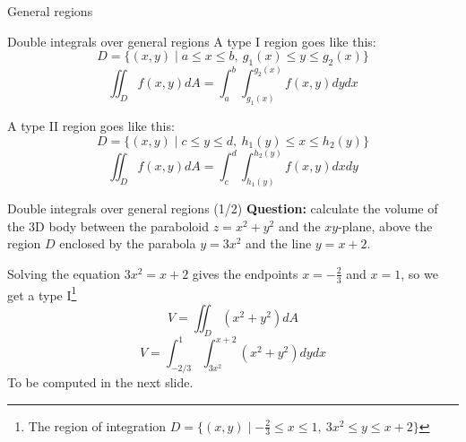\begin{frame}{General regions}

    \begin{theorybox}{Double integrals over general regions}
    A type I region goes like this:
    \[D=\{(x,y)\mid a\leq x\leq b,~ g_1(x)\leq y\leq g_2(x)\}\]
        \[\iint_D f(x,y)dA=\int_a^b\int_{g_1(x)}^{g_2(x)}f(x,y)dydx\]

    \pause A type II region goes like this:
    \[D=\{(x,y)\mid c\leq y\leq d,~ h_1(y)\leq x\leq h_2(y)\}\]
        \[\iint_D f(x,y)dA=\int_c^d\int_{h_1(y)}^{h_2(y)}f(x,y)dxdy\]
    \end{theorybox}
\end{frame}

\begin{frame}{Double integrals over general regions (1/2)}
         \textbf{Question:} calculate the volume of the 3D body between the paraboloid $z=x^2+y^2$ and the $xy$-plane, above the region $D$ enclosed by the parabola $y=3x^2$ and the line $y=x+2$.

            \begin{minipage}{0.38\textwidth}
            \end{minipage}\hspace{1.5cm}
            \begin{minipage}{0.47\textwidth}

                \pause Solving the equation $3x^2=x+2$ gives the endpoints $x=-\frac{2}{3}$ and $x=1$, so we get a type I\footnote{The region of integration $D=\{(x,y)\mid-\frac{2}{3}\leq x\leq1,~3x^2\leq y\leq x+2\}$} \vspace{-2mm}\[V=\iint_{D}(x^2+y^2)dA\]\vspace{-2mm}\[\boxed{V=\int_{-2/3}^{1}\int_{3x^2}^{x+2}(x^2+y^2)dydx}\]
To be computed in the next slide.
            \end{minipage}

\end{frame}

